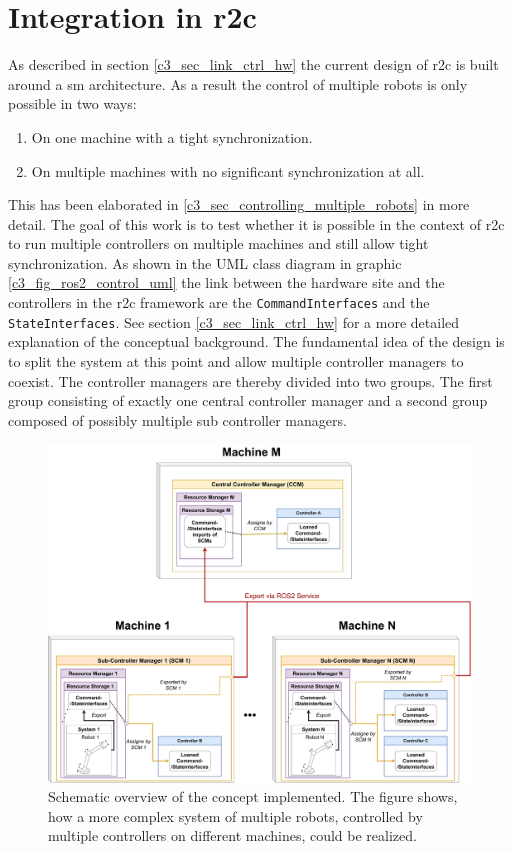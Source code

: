 \section{Integration in \gls{r2c}}
As described in section \ref{c3_sec_link_ctrl_hw} the current design of \gls{r2c} is built around a \gls{sm} architecture. As a result the control of multiple robots is only possible in two ways: 
\begin{enumerate}
    \item On one machine with a tight synchronization. 
    \item On multiple machines with no significant synchronization at all.
\end{enumerate}
This has been elaborated in \ref{c3_sec_controlling_multiple_robots} in more detail. The goal of this work is to test whether it is possible in the context of \gls{r2c} to run multiple controllers on multiple machines and still allow tight synchronization.\newline
As shown in the UML class diagram in graphic \ref{c3_fig_ros2_control_uml} the link between the hardware site and the controllers in the \gls{r2c} framework are the \texttt{CommandInterfaces} and the \texttt{StateInterfaces}. See section \ref{c3_sec_link_ctrl_hw} for a more detailed explanation of the conceptual background. \newline
The fundamental idea of the design is to split the system at this point and allow multiple controller managers to coexist. The controller managers are thereby divided into two groups. The first group consisting of exactly one central controller manager and a second group composed of possibly multiple sub controller managers.
\begin{figure}[htbp]
	\centering
	\includegraphics[width=1\textwidth]{Figures/C4/distributed_control.drawio.pdf}
	\caption{Schematic overview of the concept implemented. The figure shows, how a more complex system of multiple robots, controlled by multiple controllers on different machines, could be realized. }
	\label{c4_fig_concept_overview}
\end{figure}
